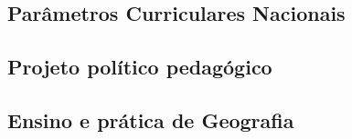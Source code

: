 \hspace{1.5cm}
\subsection*{Parâmetros Curriculares Nacionais}

\subsection*{Projeto político pedagógico}

\subsection*{Ensino e prática de Geografia}